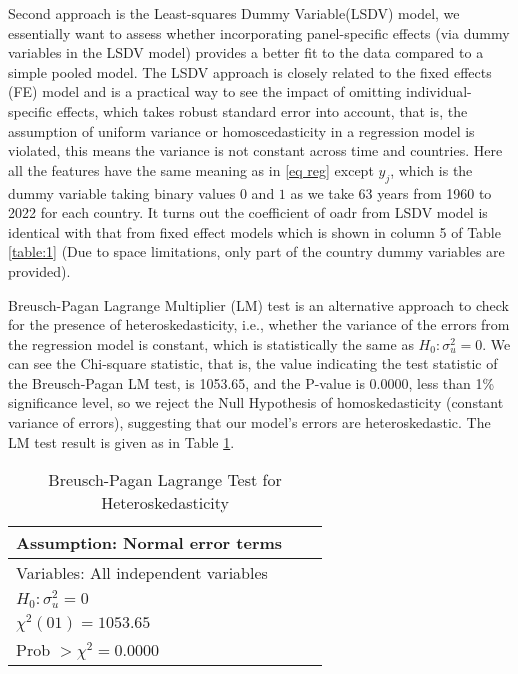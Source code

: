 \documentclass[ %
    final,
    scrbook,
    listoffigures,
    listoftables, 
    glossary]{cu-thesis}
\begin{document}
Second approach is the Least-squares Dummy Variable(LSDV) model, we essentially want to assess whether incorporating panel-specific effects (via dummy variables in the LSDV model) provides a better fit to the data compared to a simple pooled model. The LSDV approach is closely related to the fixed effects (FE) model and is a practical way to see the impact of omitting individual-specific effects, which takes robust standard error into account, that is, the assumption of uniform variance or homoscedasticity in a regression model is violated, this means the variance is not constant across time and countries. Here all the features have the same meaning as in \ref{eq reg} except $y_j$, which is the dummy variable taking binary values $0$ and $1$ as we take 63 years from 1960 to 2022 for each country. It turns out the coefficient of oadr from LSDV model is identical with that from fixed effect models which is shown in column 5 of Table \ref{table:1} (Due to space limitations, only part of the country dummy variables are provided). 

Breusch-Pagan Lagrange Multiplier (LM) test \cite{breusch1980lagrange} is an alternative approach to check for the presence of heteroskedasticity, i.e., whether the variance of the errors from the regression model is constant, which is statistically the same as $H_{0}: \sigma^{2}_{u}=0$. We can see the Chi-square statistic, that is, the value indicating the test statistic of the Breusch-Pagan LM test, is 1053.65, and the P-value is 0.0000, less than 1\% significance level, so we reject the Null Hypothesis of homoskedasticity (constant variance of errors), suggesting that our model's errors are heteroskedastic. The LM test result is given as in Table \ref{table:2}.


\begin{table}[t]
\centering
\caption{Breusch-Pagan Lagrange Test for Heteroskedasticity}
\label{table:2}
\begin{tabular}{lll}\toprule
Assumption: Normal error terms\\ \midrule
Variables: All independent variables\\
$H_0: \sigma^{2}_{u}=0$ \\

$\chi^{2}(01)=1053.65$\\
Prob $> \chi^{2} = 0.0000$\\ \bottomrule
	\end{tabular}
\end{table}
\end{document}
